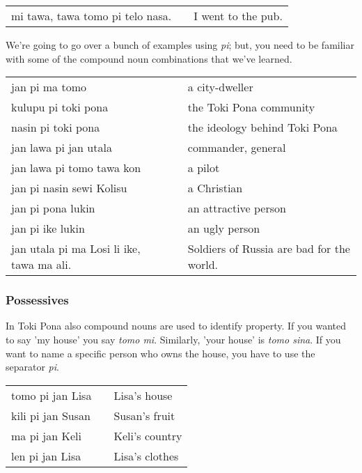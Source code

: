 \begin{supertabular}{p{5,5cm}|ll}
    mi tawa, tawa tomo pi telo nasa. &  & I went to the pub. \\
\end{supertabular}

We're going to go over a bunch of examples using \textit{pi}; but, you need to be familiar with some of the compound noun combinations that we've learned.

\begin{supertabular}{p{5,5cm}|ll}
    jan pi ma tomo                            &  & a city-dweller                            \\
    kulupu pi toki pona                       &  & the Toki Pona community                   \\
    nasin pi toki pona                        &  & the ideology behind Toki Pona             \\
    jan lawa pi jan utala                     &  & commander, general                        \\
    jan lawa pi tomo tawa kon                 &  & a pilot                                   \\
    jan pi nasin sewi Kolisu                  &  & a Christian                               \\
    jan pi pona lukin                         &  & an attractive person                      \\
    jan pi ike lukin                          &  & an ugly person                            \\
    jan utala pi ma Losi li ike, tawa ma ali. &  & Soldiers of Russia are bad for the world. \\
\end{supertabular}

\newpage
\subsubsection*{Possessives}
In Toki Pona also compound nouns are used to identify property.
If you wanted to say 'my house' you say \textit{tomo mi}.
Similarly, 'your house' is \textit{tomo sina}.
If you want to name a specific person who owns the house, you have to use the separator \textit{pi}.

\begin{supertabular}{p{5,5cm}|ll}
    tomo pi jan Lisa  &  & Lisa's house   \\
    kili pi jan Susan &  & Susan's fruit  \\
    ma pi jan Keli    &  & Keli's country \\
    len pi jan Lisa   &  & Lisa's clothes \\
\end{supertabular}

